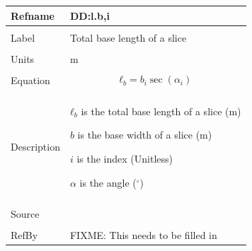 \documentclass[12pt]{article}
\begin{document}
\noindent \begin{minipage}{\textwidth}
\begin{tabular}{p{} p{}}
\toprule \textbf{Refname} & \textbf{DD:l.b,i}
\label{DD:l.b,i}
\\ \midrule \\
Label & Total base length of a slice
\\ \midrule \\
Units & m
\\ \midrule \\
Equation & \begin{dmath}
           {ℓ_{b}}=b_{i} \sec\left(α_{i}\right)
           \end{dmath}
\\ \midrule \\
Description & \begin{symbDescription}
              \item{${ℓ_{b}}$ is the total base length of a slice (m)}
              \item{$b$ is the base width of a slice (m)}
              \item{$i$ is the index (Unitless)}
              \item{$α$ is the angle (${}^{\circ}$)}
              \end{symbDescription}
\\ \midrule \\
Source &
\\ \midrule \\
RefBy & FIXME: This needs to be filled in
\\ \bottomrule \end{tabular}
\end{minipage}\\
~\newline
\end{document}
